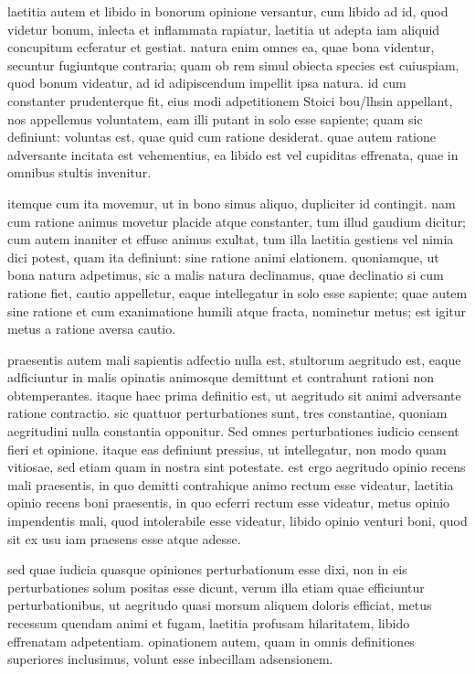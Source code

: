  laetitia autem et libido in bonorum opinione versantur, cum libido ad id, quod videtur bonum, inlecta et inflammata rapiatur, laetitia ut adepta iam aliquid concupitum ecferatur et gestiat. natura enim omnes ea, quae bona videntur, secuntur fugiuntque contraria; quam ob rem simul obiecta species est cuiuspiam, quod bonum videatur, ad id adipiscendum impellit ipsa natura. id cum constanter prudenterque fit, eius modi adpetitionem Stoici bou/lhsin appellant, nos appellemus voluntatem, eam illi putant in solo esse sapiente; quam sic definiunt: voluntas est, quae quid cum ratione desiderat. quae autem ratione adversante incitata est vehementius, ea libido est vel cupiditas effrenata, quae in omnibus stultis invenitur.

 itemque cum ita movemur, ut in bono simus aliquo, dupliciter id contingit. nam cum ratione animus movetur placide atque constanter, tum illud gaudium dicitur; cum autem inaniter et effuse animus exultat, tum illa laetitia gestiens vel nimia dici potest, quam ita definiunt: sine ratione animi elationem. quoniamque, ut bona natura adpetimus, sic a malis natura declinamus, quae declinatio si cum ratione fiet, cautio appelletur, eaque intellegatur in solo esse sapiente; quae autem sine ratione et cum exanimatione humili atque fracta, nominetur metus; est igitur metus a ratione aversa cautio.

 praesentis autem mali sapientis adfectio nulla est, stultorum aegritudo est, eaque adficiuntur in malis opinatis animosque demittunt et contrahunt rationi non obtemperantes. itaque haec prima definitio est, ut aegritudo sit animi adversante ratione contractio. sic quattuor perturbationes sunt, tres constantiae, quoniam aegritudini nulla constantia opponitur. Sed omnes perturbationes iudicio censent fieri et opinione. itaque eas definiunt pressius, ut intellegatur, non modo quam vitiosae, sed etiam quam in nostra sint potestate. est ergo aegritudo opinio recens mali praesentis, in quo demitti contrahique animo rectum esse videatur, laetitia opinio recens boni praesentis, in quo ecferri rectum esse videatur, metus opinio impendentis mali, quod intolerabile esse videatur, libido opinio venturi boni, quod sit ex usu iam praesens esse atque adesse.

 sed quae iudicia quasque opiniones perturbationum esse dixi, non in eis perturbationes solum positas esse dicunt, verum illa etiam quae efficiuntur perturbationibus, ut aegritudo quasi morsum aliquem doloris efficiat, metus recessum quendam animi et fugam, laetitia profusam hilaritatem, libido effrenatam adpetentiam. opinationem autem, quam in omnis definitiones superiores inclusimus, volunt esse inbecillam adsensionem.

